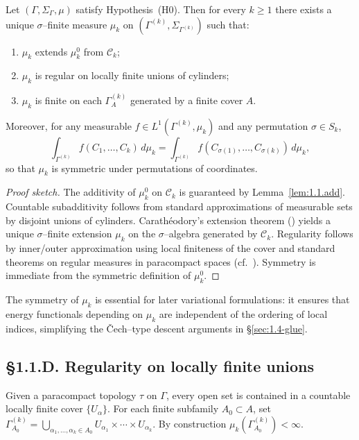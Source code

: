 \begin{theorem}\label{thm:1.1.carath}
Let $(\Gamma,\Sigma_\Gamma,\mu)$ satisfy Hypothesis~(H0). 
Then for every $k\ge1$ there exists a unique $\sigma$–finite measure $\mu_k$ on $(\Gamma^{(k)},\Sigma_{\Gamma^{(k)}})$ such that:
\begin{enumerate}
  \item $\mu_k$ extends $\mu_k^0$ from $\mathscr C_k$;
  \item $\mu_k$ is regular on locally finite unions of cylinders;
  \item $\mu_k$ is finite on each $\Gamma^{(k)}_A$ generated by a finite cover $A$.
\end{enumerate}
Moreover, for any measurable $f\in L^1(\Gamma^{(k)},\mu_k)$ and any permutation $\sigma\in S_k$,
\[
\int_{\Gamma^{(k)}} f(C_1,\ldots,C_k)\,d\mu_k
=\int_{\Gamma^{(k)}} f(C_{\sigma(1)},\ldots,C_{\sigma(k)})\,d\mu_k,
\]
so that $\mu_k$ is symmetric under permutations of coordinates.
\end{theorem}

\begin{proof}[Proof sketch]
The additivity of $\mu_k^0$ on $\mathscr C_k$ is guaranteed by Lemma~\ref{lem:1.1.add}.
Countable subadditivity follows from standard approximations of measurable sets by disjoint unions of cylinders.
Carathéodory’s extension theorem (\cite{Halmos,Bogachev1,Bogachev2}) yields a unique $\sigma$–finite extension $\mu_k$ on the $\sigma$–algebra generated by $\mathscr C_k$.
Regularity follows by inner/outer approximation using local finiteness of the cover and standard theorems on regular measures in paracompact spaces (cf.\ \cite[Th.\,7.8.1]{Bogachev1}).
Symmetry is immediate from the symmetric definition of $\mu_k^0$.
\end{proof}

\begin{remark}
The symmetry of $\mu_k$ is essential for later variational formulations: it ensures that energy functionals depending on $\mu_k$ are independent of the ordering of local indices, simplifying the Čech–type descent arguments in §\ref{sec:1.4-glue}.
\end{remark}

\subsection*{§1.1.D. Regularity on locally finite unions}
Given a paracompact topology $\tau$ on $\Gamma$, every open set is contained in a countable locally finite cover $\{U_\alpha\}$. 
For each finite subfamily $A_0\subset A$, set $\Gamma_{A_0}^{(k)}=\bigcup_{\alpha_1,\ldots,\alpha_k\in A_0}U_{\alpha_1}\times\cdots\times U_{\alpha_k}$.
By construction $\mu_k(\Gamma_{A_0}^{(k)})<\infty$.

